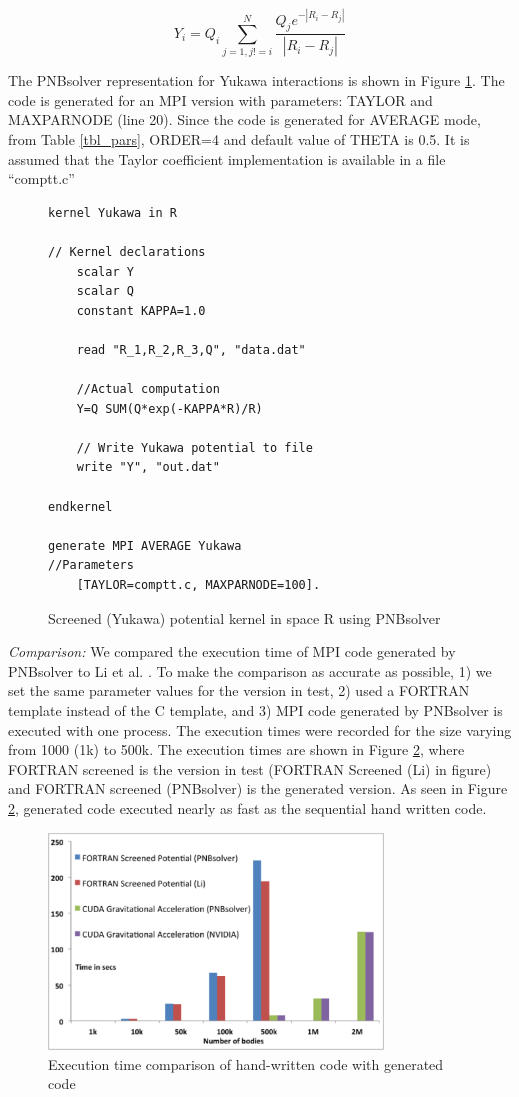 \documentclass[draftclsnofoot]{elsarticle}
\begin{document}
\begin{equation}
\label{eqn_yukawa}
Y_i=Q_i \sum \limits_{j=1,j!=i}^{N} \frac{Q_je^{-|R_i-R_j|}}{|R_i- R_j|} 
\end{equation}

The PNBsolver representation for Yukawa interactions is shown in Figure \ref{fig_yukawa}. The code is generated for an MPI version with parameters: 
TAYLOR and MAXPARNODE (line 20). Since the code is generated for AVERAGE mode, from Table \ref{tbl_pars}, ORDER=4 and default value of THETA is 0.5.   
It is assumed that the Taylor coefficient implementation is available in a file ``comptt.c'' 

\begin{figure}[h]
\centering
\begin{lstlisting}[style=AMMA, language=PNB]
kernel Yukawa in R

// Kernel declarations
	scalar Y
	scalar Q
	constant KAPPA=1.0
	
	read "R_1,R_2,R_3,Q", "data.dat"

	//Actual computation
	Y=Q SUM(Q*exp(-KAPPA*R)/R)

	// Write Yukawa potential to file 
	write "Y", "out.dat"
	
endkernel

generate MPI AVERAGE Yukawa 
//Parameters
	[TAYLOR=comptt.c, MAXPARNODE=100]. 
\end{lstlisting}
\caption{Screened (Yukawa) potential kernel in space R using PNBsolver}
\label{fig_yukawa}
\end{figure}

\textit{Comparison: }
We compared the execution time of MPI code generated by PNBsolver to Li et al. \cite{li}.  To make the comparison as accurate as possible, 1) we set the same parameter 
values for the version in test, 2) used a FORTRAN template instead of the C template, and 3) MPI code generated by PNBsolver is executed with one process. 
The execution times were recorded for the size varying from 1000 (1k) to 500k. The execution times are shown in Figure \ref{fig_cmp}, where FORTRAN screened \cite{li} is the
version in test (FORTRAN Screened (Li) in figure) and FORTRAN screened (PNBsolver) is the generated version. As seen in Figure \ref{fig_cmp}, generated code executed nearly as fast as the sequential hand written code. 
 

\begin{figure}[!t]
\centering
\includegraphics[width=3.5in]{cmp.eps}
\caption{Execution time comparison of hand-written code with generated code}
\label{fig_cmp}
\end{figure}
\end{document}
